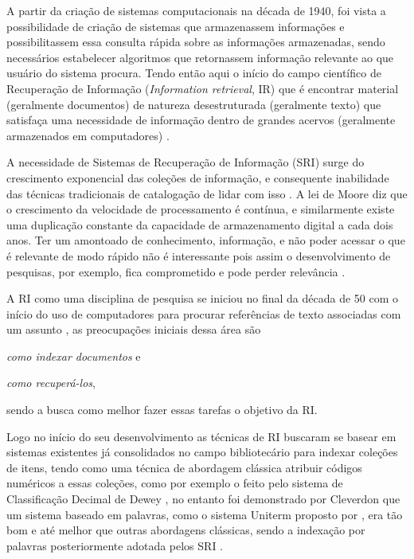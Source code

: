 
A partir da criação de sistemas computacionais na década de 1940, foi vista a possibilidade de criação de sistemas que armazenassem informações e possibilitassem essa consulta rápida sobre as informações armazenadas, sendo necessários estabelecer algoritmos que retornassem informação relevante ao que usuário do sistema procura. 
Tendo então aqui o início do campo científico de Recuperação de Informação (\textit{Information retrieval}, IR) que é encontrar material (geralmente documentos) de natureza desestruturada (geralmente texto) que satisfaça uma necessidade de informação dentro de grandes acervos (geralmente armazenados em computadores) \cite{Manning2008IIR}.

A necessidade de Sistemas de Recuperação de Informação (SRI) surge do crescimento exponencial das coleções de informação, e consequente inabilidade das técnicas tradicionais de catalogação de lidar com isso \cite{Sanderson2012THIRR}. 
A lei de Moore diz que o crescimento da velocidade de processamento é contínua, e similarmente existe uma duplicação constante da capacidade de armazenamento digital a cada dois anos. 
Ter um amontoado de conhecimento, informação, e não poder acessar o que é relevante de modo rápido não é interessante pois assim o desenvolvimento de pesquisas, por exemplo, fica comprometido e pode perder relevância \cite{Bush:1979:WMT:1113634.1113638}.

A RI como uma disciplina de pesquisa se iniciou no final da década de 50 com o início do uso de computadores para procurar referências de texto associadas com um assunto \cite[p.~3]{Sanderson2012THIRR}, as preocupações iniciais dessa área são 
\begin{enumerate*}[label=(\alph*)]
\item \textit{como indexar documentos} e \item \textit{como recuperá-los},
\end{enumerate*}
sendo a busca como melhor fazer essas tarefas o objetivo da RI.

Logo no início do seu desenvolvimento as técnicas de RI buscaram se basear em sistemas existentes já consolidados no campo bibliotecário para indexar coleções de itens, tendo como uma técnica de abordagem clássica atribuir códigos numéricos a essas coleções, como por exemplo o feito pelo sistema de Classificação Decimal de Dewey \cite[p.~1446]{Sanderson2012THIRR}, no entanto foi demonstrado por Cleverdon que um sistema baseado em palavras, como o sistema Uniterm proposto por , era tão bom e até melhor que outras abordagens clássicas, sendo a indexação por palavras posteriormente adotada pelos SRI \cite[p.~1446]{Sanderson2012THIRR}.

